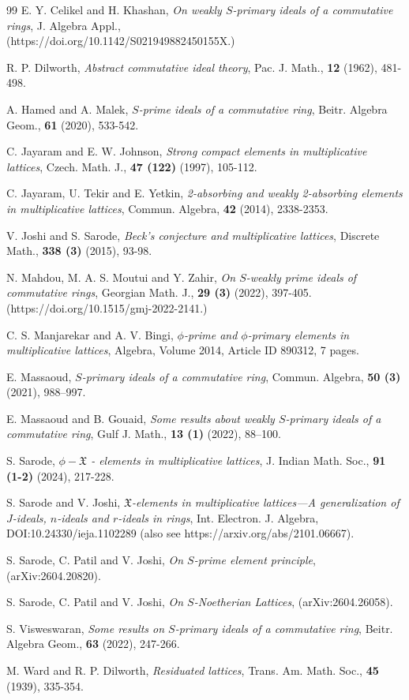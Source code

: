 \documentclass[10pt,twoside,a4paper]{amsart}
\numberwithin{equation}{section}
\theoremstyle{plain}
\theoremstyle{definition}
\begin{document}
\begin{thebibliography}{99}
	 E. Y. Celikel and H. Khashan, {\it On weakly $S$-primary ideals of a commutative rings}, J. Algebra  Appl.,\\ (https://doi.org/10.1142/S021949882450155X.)
	
	 R. P. Dilworth, {\it Abstract commutative ideal theory}, Pac. J. Math., {\bf 12} (1962), 481-498.
	
	 A. Hamed and A. Malek, {\it $S$-prime ideals of a commutative ring}, Beitr. Algebra Geom., {\bf 61} (2020), 533-542.
	
	 C. Jayaram and E. W. Johnson, {\it Strong compact elements in multiplicative lattices}, Czech. Math. J., {\bf 47 (122)} (1997), 105-112.
	
	 C. Jayaram, U. Tekir and E. Yetkin, {\it 2-absorbing and weakly 2-absorbing elements in multiplicative lattices}, Commun. Algebra, {\bf 42} (2014), 2338-2353.
	
	 V. Joshi and S. Sarode, {\it Beck's conjecture and multiplicative lattices}, Discrete Math., {\bf 338 (3)} (2015), 93-98.
	
	 N. Mahdou, M. A. S. Moutui and Y. Zahir, {\it On $S$-weakly prime ideals of commutative rings}, Georgian Math. J., {\bf 29 (3)} (2022), 397-405. (https://doi.org/10.1515/gmj-2022-2141.)
	
	 C. S. Manjarekar and A. V. Bingi, {\it $\phi$-prime and $\phi$-primary elements in multiplicative lattices}, Algebra, Volume 2014, Article ID 890312, 7 pages.
	
	 E. Massaoud, {\it $S$-primary ideals of a commutative ring}, Commun. Algebra, {\bf 50 (3)} (2021), 988–997.
	
	 E. Massaoud and B. Gouaid, {\it Some results about weakly $S$-primary ideals of a commutative ring}, Gulf J. Math., {\bf 13 (1)} (2022), 88–100.
	
	 S. Sarode, {\it $\phi - \mathfrak{X}$ - elements in multiplicative lattices}, J. Indian Math. Soc., {\bf 91 (1-2)} (2024), 217-228.
	
	 S. Sarode and V. Joshi, {\it $\mathfrak{X}$-elements in multiplicative lattices—A generalization of $J$-ideals, $n$-ideals and $r$-ideals in rings}, Int. Electron. J. Algebra, DOI:10.24330/ieja.1102289 (also see https://arxiv.org/abs/2101.06667).
	
	 S. Sarode, C. Patil and V. Joshi, {\it On $S$-prime element principle}, (arXiv:2604.20820).
	
	 S. Sarode, C. Patil and V. Joshi, {\it On $S$-Noetherian Lattices}, (arXiv:2604.26058).
	
	 S. Visweswaran, {\it Some results on $S$-primary ideals of a commutative ring}, Beitr. Algebra Geom., {\bf 63} (2022), 247-266.
	
	 M. Ward and R. P. Dilworth, {\it Residuated lattices}, Trans. Am. Math. Soc., {\bf 45} (1939), 335-354.
\end{thebibliography}

		
\end{document}
